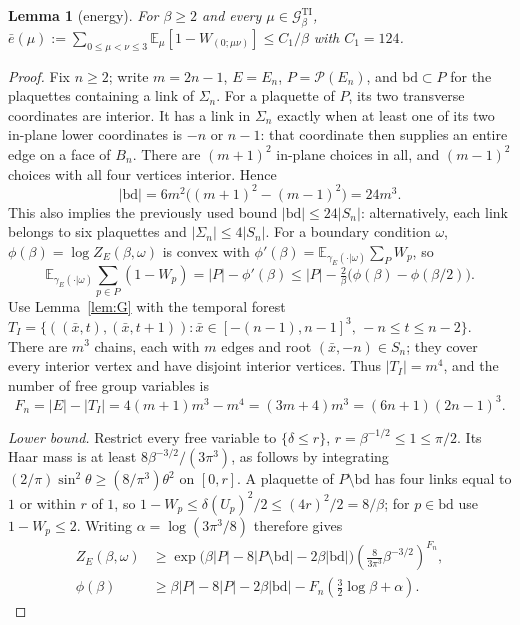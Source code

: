 \documentclass[11pt,a4paper]{article}
\theoremstyle{plain}
\newtheorem{lemma}[theorem]{Lemma}
\theoremstyle{definition}
\theoremstyle{remark}
\numberwithin{equation}{section}
\newcommand{\E}{\mathbb{E}}
\newcommand{\cP}{\mathcal{P}}
\newcommand{\cG}{\mathcal{G}}
\begin{document}
\begin{lemma}[energy]\label{lem:L1}
For $\beta\ge2$ and every $\mu\in\cG^{\mathrm{TI}}_\beta$, $\bar e(\mu):=\sum_{0\le\mu<\nu\le3}\E_\mu[1-W_{(0;\mu\nu)}]\le C_1/\beta$ with $C_1=124$.
\end{lemma}
\begin{proof}
Fix $n\ge2$; write $m=2n-1$, $E=E_n$, $P=\cP(E_n)$, and $\mathrm{bd}\subset P$ for the plaquettes containing a link of $\Sigma_n$.
For a plaquette of $P$, its two transverse coordinates are interior. It has a link in $\Sigma_n$ exactly when at least one of
its two in-plane lower coordinates is $-n$ or $n-1$: that coordinate then supplies an entire edge on a face of $B_n$.
There are $(m+1)^2$ in-plane choices in all, and $(m-1)^2$ choices with all four vertices interior. Hence
\[
|\mathrm{bd}|=6m^2\bigl((m+1)^2-(m-1)^2\bigr)=24m^3.
\]
This also implies the previously used bound $|\mathrm{bd}|\le24|S_n|$: alternatively, each link belongs to six plaquettes and
$|\Sigma_n|\le4|S_n|$. For a boundary condition $\omega$, $\phi(\beta)=\log Z_E(\beta,\omega)$ is convex with
$\phi'(\beta)=\E_{\gamma_E(\cdot|\omega)}\sum_PW_p$, so
\begin{equation}\label{eq:conv}
\E_{\gamma_E(\cdot|\omega)}\sum_{p\in P}(1-W_p)=|P|-\phi'(\beta)\le|P|-\tfrac2\beta\bigl(\phi(\beta)-\phi(\beta/2)\bigr).
\end{equation}
Use Lemma~\ref{lem:G} with the temporal forest $T_I=\{((\bar x,t),(\bar x,t+1)):\bar x\in[-(n-1),n-1]^3,\,-n\le t\le n-2\}$.
There are $m^3$ chains, each with $m$ edges and root $(\bar x,-n)\in S_n$; they cover every interior vertex and have disjoint
interior vertices. Thus $|T_I|=m^4$, and the number of free group variables is
\[
F_n=|E|-|T_I|=4(m+1)m^3-m^4=(3m+4)m^3=(6n+1)(2n-1)^3.
\]

\emph{Lower bound.} Restrict every free variable to $\{\delta\le r\}$, $r=\beta^{-1/2}\le1\le\pi/2$.
Its Haar mass is at least $8\beta^{-3/2}/(3\pi^3)$, as follows by integrating
$(2/\pi)\sin^2\theta\ge(8/\pi^3)\theta^2$ on $[0,r]$.
A plaquette of $P\setminus\mathrm{bd}$ has four links equal to $1$ or within $r$ of $1$, so
$1-W_p\le\delta(U_p)^2/2\le(4r)^2/2=8/\beta$; for $p\in\mathrm{bd}$ use $1-W_p\le2$.
Writing $\alpha=\log(3\pi^3/8)$ therefore gives
\[
\begin{split}
Z_E(\beta,\omega)
&\ge \exp\bigl(\beta|P|-8|P\setminus\mathrm{bd}|-2\beta|\mathrm{bd}|\bigr)
       \left(\frac8{3\pi^3}\beta^{-3/2}\right)^{F_n},\\
\phi(\beta)&\ge\beta|P|-8|P|-2\beta|\mathrm{bd}|
                  -F_n\left(\frac32\log\beta+\alpha\right).
\end{split}
\]


\end{proof}
\end{document}
